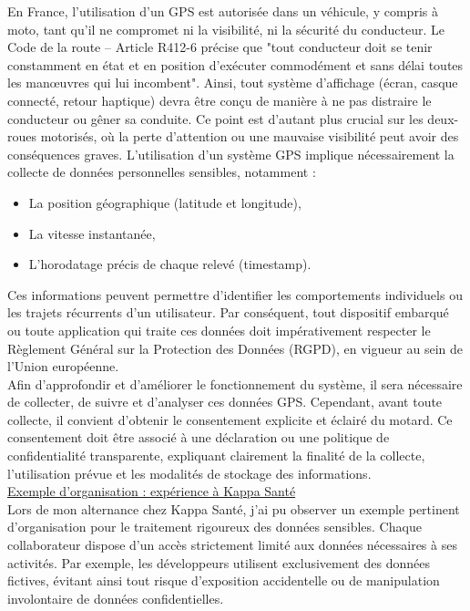 \vspace{0.5cm}
En France, l'utilisation d’un GPS est autorisée dans un véhicule, y compris à moto, tant qu’il ne compromet ni la visibilité, ni la sécurité du conducteur. Le Code de la route – Article R412-6\cite{loi_code_de_la_route} précise que "tout conducteur doit se tenir constamment en état et en position d'exécuter commodément et sans délai toutes les manœuvres qui lui incombent".
Ainsi, tout système d’affichage (écran, casque connecté, retour haptique) devra être conçu de manière à ne pas distraire le conducteur ou gêner sa conduite. Ce point est d’autant plus crucial sur les deux-roues motorisés, où la perte d’attention ou une mauvaise visibilité peut avoir des conséquences graves.
\vspace{0.5cm}
L'utilisation d'un système GPS implique nécessairement la collecte de données personnelles sensibles, notamment :
\begin{itemize}
\item La position géographique (latitude et longitude),
\item La vitesse instantanée,
\item L'horodatage précis de chaque relevé (timestamp).
\end{itemize}
Ces informations peuvent permettre d'identifier les comportements individuels ou les trajets récurrents d'un utilisateur. Par conséquent, tout dispositif embarqué ou toute application qui traite ces données doit impérativement respecter le Règlement Général sur la Protection des Données (RGPD), en vigueur au sein de l'Union européenne.\\
Afin d'approfondir et d'améliorer le fonctionnement du système, il sera nécessaire de collecter, de suivre et d'analyser ces données GPS. Cependant, avant toute collecte, il convient d'obtenir le consentement explicite et éclairé du motard. Ce consentement doit être associé à une déclaration ou une politique de confidentialité transparente, expliquant clairement la finalité de la collecte, l'utilisation prévue et les modalités de stockage des informations.\\
\underline{Exemple d’organisation : expérience à Kappa Santé}\\
Lors de mon alternance chez Kappa Santé, j'ai pu observer un exemple pertinent d'organisation pour le traitement rigoureux des données sensibles. Chaque collaborateur dispose d'un accès strictement limité aux données nécessaires à ses activités. Par exemple, les développeurs utilisent exclusivement des données fictives, évitant ainsi tout risque d'exposition accidentelle ou de manipulation involontaire de données confidentielles.
